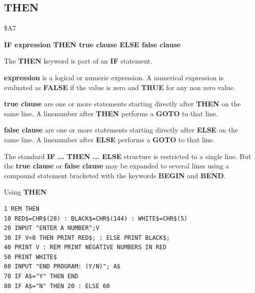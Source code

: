 \subsection{THEN}
\begin{description}[leftmargin=2cm,style=nextline]
\item [Token:] \$A7
\item [Format:] {\bf IF expression THEN true clause ELSE false clause}
\item [Usage:] The {\bf THEN} keyword is part of an {\bf IF}
               statement.

               {\bf expression} is a logical or numeric expression.
               A numerical expression is evaluated as {\bf FALSE}
               if the value is zero and {\bf TRUE} for any non zero
               value.

               {\bf true clause} are one or more statements starting
               directly after {\bf THEN} on the same line.
               A linenumber after {\bf THEN} performs a
               {\bf GOTO} to that line.

               {\bf false clause} are one or more statements starting
               directly after {\bf ELSE} on the same line.
               A linenumber after {\bf ELSE} performs a
               {\bf GOTO} to that line.

\item [Remarks:]
               The standard {\bf IF ... THEN ... ELSE} structure
               is restricted to a single line. But the {\bf true clause}
               or {\bf false clause} may be expanded to several lines
               using a compound statement bracketed with the keywords
               {\bf BEGIN} and {\bf BEND}.
\item [Example:]
                Using {\bf THEN}
\begin{tcolorbox}[colback=black,coltext=white]
\verbatimfont{\codefont}
\begin{verbatim}
1 REM THEN
10 RED$=CHR$(28) : BLACK$=CHR$(144) : WHITE$=CHR$(5)
20 INPUT "ENTER A NUMBER";V
30 IF V<0 THEN PRINT RED$; : ELSE PRINT BLACK$;
40 PRINT V : REM PRINT NEGATIVE NUMBERS IN RED
50 PRINT WHITE$
60 INPUT "END PROGRAM: (Y/N)"; A$
70 IF A$="Y" THEN END
80 IF A$="N" THEN 20 : ELSE 60
\end{verbatim}
\end{tcolorbox}
\end{description}


